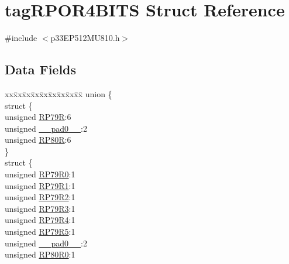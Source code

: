 \hypertarget{structtag_r_p_o_r4_b_i_t_s}{}\section{tag\+R\+P\+O\+R4\+B\+I\+TS Struct Reference}
\label{structtag_r_p_o_r4_b_i_t_s}


{\ttfamily \#include $<$p33\+E\+P512\+M\+U810.\+h$>$}

\subsection*{Data Fields}
\begin{DoxyCompactItemize}
\item 
\begin{tabbing}
xx\=xx\=xx\=xx\=xx\=xx\=xx\=xx\=xx\=\kill
union \{\\
\>struct \{\\
\>\>unsigned \hyperlink{structtag_r_p_o_r4_b_i_t_s_a5d5e64a5700d54e3801c4f402644883e}{RP79R}:6\\
\>\>unsigned \hyperlink{structtag_r_p_o_r4_b_i_t_s_adf71f3d8410c1f1dbbc96680a92c49af}{\_\_pad0\_\_}:2\\
\>\>unsigned \hyperlink{structtag_r_p_o_r4_b_i_t_s_a04a4c24c74af8b93395f0e551363c492}{RP80R}:6\\
\>\} \\
\>struct \{\\
\>\>unsigned \hyperlink{structtag_r_p_o_r4_b_i_t_s_aa8dbcf97ae4a54b19f8aff9948816aaf}{RP79R0}:1\\
\>\>unsigned \hyperlink{structtag_r_p_o_r4_b_i_t_s_aaae29602500bedf22ed94a337a0334c7}{RP79R1}:1\\
\>\>unsigned \hyperlink{structtag_r_p_o_r4_b_i_t_s_a9f05691100f8ca7c140c0276ec655528}{RP79R2}:1\\
\>\>unsigned \hyperlink{structtag_r_p_o_r4_b_i_t_s_a922245d9950811af7aec3ddea4eb124d}{RP79R3}:1\\
\>\>unsigned \hyperlink{structtag_r_p_o_r4_b_i_t_s_acc5c09adc2edff697ea2290ba068ac55}{RP79R4}:1\\
\>\>unsigned \hyperlink{structtag_r_p_o_r4_b_i_t_s_a8647ba21f81b67b55f493afa7f57be99}{RP79R5}:1\\
\>\>unsigned \hyperlink{structtag_r_p_o_r4_b_i_t_s_adf71f3d8410c1f1dbbc96680a92c49af}{\_\_pad0\_\_}:2\\
\>\>unsigned \hyperlink{structtag_r_p_o_r4_b_i_t_s_a783a512723cf0b6781c4ec974b36f5a1}{RP80R0}:1\\

\end{tabbing}
\end{DoxyCompactItemize}
